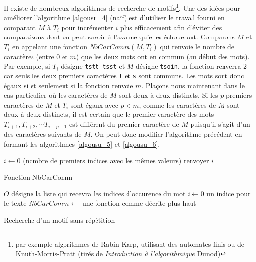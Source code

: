 Il existe de nombreux algorithmes de recherche de motifs\footnote{par exemple algorithmes de Rabin-Karp, utilisant des automates finis ou de Knuth-Morris-Pratt (tirés de \emph{Introduction à l'algorithmique} Dunod)}. Une des idées pour améliorer l'algorithme \ref{algousu_4} (naïf) est d'utiliser le travail fourni en comparant $M$ à $T_i$ pour incrémenter $i$ plus efficacement afin d'éviter des comparaisons dont on peut savoir à l'avance qu'elles échoueront.\newline
Comparons $M$ et $T_i$ en appelant une fonction $NbCarComm(M,T_i)$ qui renvoie le nombre de caractères (entre 0 et $m$) que les deux mots ont en commun (au début des mots).\newline
Par exemple, si $T_i$ désigne \verb|tstt-tsst| et $M$ désigne \verb|tsoin|, la fonction renverra $2$ car seuls les deux premiers caractères \verb|t| et \verb|s| sont communs. Les mots sont donc égaux si et seulement si la fonction renvoie $m$.\newline
Plaçons nous maintenant dans le cas particulier où les caractères de $M$ sont deux à deux distincts.\newline
Si les $p$ premiers caractères de $M$ et $T_i$ sont égaux avec $p<m$, comme les caractères de $M$ sont deux à deux distincts, il est certain que le premier caractère des mots $T_{i+1}, T_{i+2},\cdots T_{i+p-1}$ est différent du premier caractère de $M$ puisqu'il s'agit d'un des caractères suivants de $M$.\newline
On peut donc modifier l'algorithme précédent en formant les algorithmes \ref{algousu_5} et \ref{algousu_6}.
\begin{algorithm}
  $i\leftarrow 0$ (nombre de premiers indices avec les mêmes valeurs)\;
  renvoyer $i$\;
  \caption{Fonction NbCarComm}
  \label{algousu_5}
\end{algorithm}
\begin{algorithm}
  $O$ désigne la liste qui recevra les indices d'occurence du mot\;
  $i\leftarrow 0$ un indice pour le texte \;
  $NbCarComm \leftarrow$ une fonction comme décrite plus haut\;
  \caption{Recherche d'un motif sans répétition}
  \label{algousu_6}
\end{algorithm}

